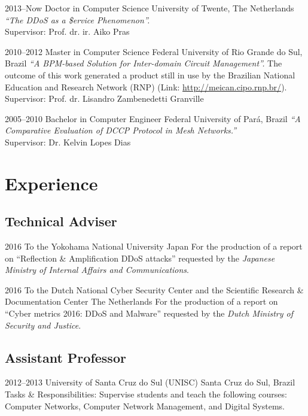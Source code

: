 \documentclass[]{friggeri-cv} %
\begin{document}
\begin{entrylist}

\entry
{2013--Now}
{Doctor {\normalfont in Computer Science}}
{University of Twente, The Netherlands}
{\emph{``The DDoS as a \$ervice Phenomenon''.} \\
Supervisor: Prof. dr. ir. Aiko Pras 
}	

\entry
{2010--2012}
{Master {\normalfont in Computer Science}}
{Federal University of Rio Grande do Sul, Brazil}
{\emph{``A BPM-based Solution for Inter-domain Circuit Management''.} The outcome of this work generated a product still in use by the Brazilian National Education and Research Network (RNP) (Link: \href{http://meican.cipo.rnp.br/}{http://meican.cipo.rnp.br/}).\\
Supervisor: Prof. dr. Lisandro Zambenedetti Granville}

\entry
{2005--2010}
{Bachelor {\normalfont in Computer Engineer}}
{Federal University of Par\'a, Brazil}
{\emph{``A Comparative Evaluation of DCCP Protocol in Mesh Networks.''} \\ 
Supervisor: Dr. Kelvin Lopes Dias
}

\end{entrylist}

\section{Experience}

\subsection{Technical Adviser}
\begin{entrylist}
\entry
{2016}
{To the Yokohama National University}
{Japan}
{For the production of a report on ``Reflection \& Amplification DDoS attacks'' requested by the \emph{Japanese Ministry of Internal Affairs and Communications}.}

\entry
{2016}
{To the Dutch National Cyber Security Center and the Scientific Research \& Documentation Center}
{The Netherlands}
{For the production of a report on ``Cyber metrics 2016: DDoS and Malware'' requested by the \emph{Dutch Ministry of Security and Justice}.}
\end{entrylist}

\subsection{Assistant Professor}
\begin{entrylist}
\entry
{2012--2013}
{University of Santa Cruz do Sul (UNISC)}
{Santa Cruz do Sul, Brazil}
{Tasks \& Responsibilities: Supervise students and teach the following courses: Computer Networks, Computer Network Management, and Digital Systems.}
\end{entrylist}
\end{document}
